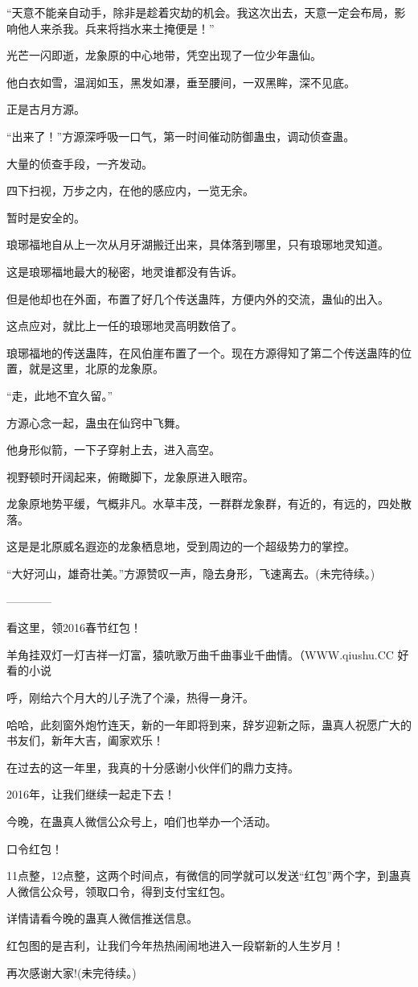\begin{this_body}
“天意不能亲自动手，除非是趁着灾劫的机会。我这次出去，天意一定会布局，影响他人来杀我。兵来将挡水来土掩便是！”

光芒一闪即逝，龙象原的中心地带，凭空出现了一位少年蛊仙。

他白衣如雪，温润如玉，黑发如瀑，垂至腰间，一双黑眸，深不见底。

正是古月方源。

“出来了！”方源深呼吸一口气，第一时间催动防御蛊虫，调动侦查蛊。

大量的侦查手段，一齐发动。

四下扫视，万步之内，在他的感应内，一览无余。

暂时是安全的。

琅琊福地自从上一次从月牙湖搬迁出来，具体落到哪里，只有琅琊地灵知道。

这是琅琊福地最大的秘密，地灵谁都没有告诉。

但是他却也在外面，布置了好几个传送蛊阵，方便内外的交流，蛊仙的出入。

这点应对，就比上一任的琅琊地灵高明数倍了。

琅琊福地的传送蛊阵，在风伯崖布置了一个。现在方源得知了第二个传送蛊阵的位置，就是这里，北原的龙象原。

“走，此地不宜久留。”

方源心念一起，蛊虫在仙窍中飞舞。

他身形似箭，一下子穿射上去，进入高空。

视野顿时开阔起来，俯瞰脚下，龙象原进入眼帘。

龙象原地势平缓，气概非凡。水草丰茂，一群群龙象群，有近的，有远的，四处散落。

这是是北原威名遐迩的龙象栖息地，受到周边的一个超级势力的掌控。

“大好河山，雄奇壮美。”方源赞叹一声，隐去身形，飞速离去。(未完待续。)

------------

看这里，领2016春节红包！

羊角挂双灯一灯吉祥一灯富，猿吭歌万曲千曲事业千曲情。（WWW.qiushu.CC 好看的小说

呼，刚给六个月大的儿子洗了个澡，热得一身汗。

哈哈，此刻窗外炮竹连天，新的一年即将到来，辞岁迎新之际，蛊真人祝愿广大的书友们，新年大吉，阖家欢乐！

在过去的这一年里，我真的十分感谢小伙伴们的鼎力支持。

2016年，让我们继续一起走下去！

今晚，在蛊真人微信公众号上，咱们也举办一个活动。

口令红包！

11点整，12点整，这两个时间点，有微信的同学就可以发送“红包”两个字，到蛊真人微信公众号，领取口令，得到支付宝红包。

详情请看今晚的蛊真人微信推送信息。

红包图的是吉利，让我们今年热热闹闹地进入一段崭新的人生岁月！

再次感谢大家!(未完待续。)

\end{this_body}

